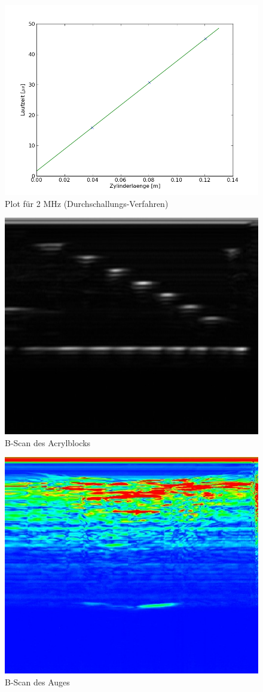 \documentclass[11pt,ngerman,a4paper]{article}
\begin{document}
\newpage
\begin{figure}[h]
\includegraphics[width=12cm]{Fig3.png}
\caption{Plot für 2 MHz (Durchschallungs-Verfahren)}
\label{fig2}
\end{figure}
\newpage
\begin{figure}[h]
\includegraphics[width=12cm]{bscan1.jpg}
\caption{B-Scan des Acrylblocks}
\label{fig3}
\end{figure}
\newpage
\begin{figure}[h]
\includegraphics[width=12cm]{bscan2.jpg}
\caption{B-Scan des Auges}
\label{fig4}
\end{figure}
\end{document}
